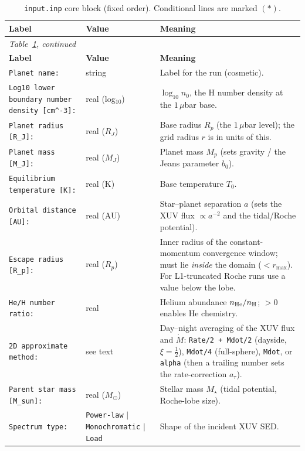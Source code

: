 \documentclass[english,a4paper]{kiseon_memo}
\newcommand{\rp}{$R_p$}
\newcommand{\msun}{$M_\odot$}
\begin{document}
\begin{longtable}{@{}p{}p{}p{}@{}}
\caption{\texttt{input.inp} core block (fixed order). Conditional lines are
marked $(\ast)$.}\label{tab:inp-core}\\
\toprule
\textbf{Label} & \textbf{Value} & \textbf{Meaning} \\
\midrule
\endfirsthead
\multicolumn{3}{l}{\small\itshape Table~\ref{tab:inp-core}, continued}\\
\toprule \textbf{Label} & \textbf{Value} & \textbf{Meaning} \\ \midrule
\endhead
\bottomrule
\endfoot
\texttt{Planet name:} & string & Label for the run (cosmetic). \\
\texttt{Log10 lower boundary number density [cm\^{}-3]:} & real (log$_{10}$) &
  $\log_{10} n_0$, the H number density at the $1\,\mu$bar base. \\
\texttt{Planet radius [R\_J]:} & real ($R_J$) & Base radius $R_p$ (the $1\,\mu$bar
  level); the grid radius $r$ is in units of this. \\
\texttt{Planet mass [M\_J]:} & real ($M_J$) & Planet mass $M_p$ (sets gravity /
  the Jeans parameter $b_0$). \\
\texttt{Equilibrium temperature [K]:} & real (K) & Base temperature $T_0$. \\
\texttt{Orbital distance [AU]:} & real (AU) & Star--planet separation $a$ (sets
  the XUV flux $\propto a^{-2}$ and the tidal/Roche potential). \\
\texttt{Escape radius [R\_p]:} & real (\rp) & Inner radius of the
  constant-momentum convergence window; must lie \emph{inside} the domain
  ($<r_{\max}$). For L1-truncated Roche runs use a value below the lobe. \\
\texttt{He/H number ratio:} & real & Helium abundance $n_{\rm He}/n_{\rm H}$;
  $>0$ enables He chemistry. \\
\texttt{2D approximate method:} & see text & Day--night averaging of the XUV
  flux and $\dot M$: \texttt{Rate/2 + Mdot/2} (dayside, $\xi=\tfrac12$),
  \texttt{Mdot/4} (full-sphere), \texttt{Mdot}, or \texttt{alpha} (then a
  trailing number sets the rate-correction $a_\tau$). \\
\texttt{Parent star mass [M\_sun]:} & real (\msun) & Stellar mass $M_\star$
  (tidal potential, Roche-lobe size). \\
\texttt{Spectrum type:} & \texttt{Power-law} $|$ \texttt{Monochromatic} $|$
  \texttt{Load} & Shape of the incident XUV SED. \\

\end{longtable}
\end{document}
